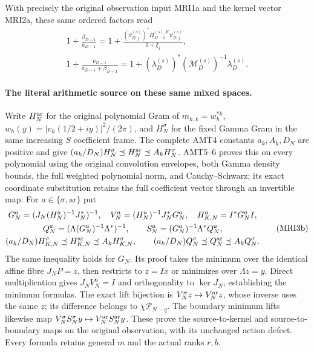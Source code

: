 \documentclass[11pt,a4paper]{article}
\begin{document}
With precisely the original observation input MRI1a and the
kernel vector MRI2a, these same ordered factors read
\[
\begin{gathered}
 1+\frac{\beta_{D-1}}{a_{D-1}}
   =1+\frac{(\vartheta_{D,j}^{(s)})^*
                  H_{D-1}^{(s),K}\vartheta_{D,j}^{(s)}}{1+\xi_j},\\
 1+\frac{\nu_{D-1}}{a_{D-1}+\beta_{D-1}}
   =1+(\lambda_D^{(s)})^*(\mathcal M_D^{(s)})^{-1}
                                              \lambda_D^{(s)}.
\end{gathered}\tag{MRI3a}
\]

\paragraph{The literal arithmetic source on these same mixed spaces.}
Write $H_N^{\rm ar}$ for the original polynomial Gram of
$m_{h,k}=w_h^{*k}$, $w_h(y)=|v_h(1/2+iy)|^2/(2\pi)$,
and $H_N^\sigma$ for the fixed Gamma Gram in the same
increasing $S$ coefficient frame. The complete AMT4 constants
$a_k,A_k,D_N$ are positive and give
$(a_k/D_N)H_N^\sigma\preceq H_N^{\rm ar}\preceq A_kH_N^\sigma$.
AMT5--6 proves this on every polynomial using the original
convolution envelopes, both Gamma density bounds, the full
weighted polynomial norm, and Cauchy--Schwarz; its exact
coordinate substitution retains the full coefficient vector
through an invertible map. For $a\in\{\sigma,\mathrm{ar}\}$ put
\[
\begin{gathered}
 G_N^a=(J_N(H_N^a)^{-1}J_N^*)^{-1},\quad
 V_N^a=(H_N^a)^{-1}J_N^*G_N^a,\quad H_{K,N}^a=I^*G_N^aI,\\
 Q_N^a=(\Lambda(G_N^a)^{-1}\Lambda^*)^{-1},\qquad
 S_N^a=(G_N^a)^{-1}\Lambda^*Q_N^a,\\
 (a_k/D_N)H_{K,N}^\sigma\preceq H_{K,N}^{\rm ar}
                                      \preceq A_kH_{K,N}^\sigma,\qquad
 (a_k/D_N)Q_N^\sigma\preceq Q_N^{\rm ar}\preceq A_kQ_N^\sigma.
\end{gathered}\tag{MRI3b}
\]
The same inequality holds for $G_N$. Its proof takes the
minimum over the identical affine fibre $J_NP=z$, then
restricts to $z=Ix$ or minimizes over $\Lambda z=y$.
Direct multiplication gives $J_NV_N^a=I$ and orthogonality
to $\ker J_N$, establishing the minimum formulas. The exact
lift bijection is $V_N^\sigma z\mapsto V_N^{\rm ar}z$,
whose inverse uses the same $z$; its difference belongs to
$\chi\mathcal P_{N-q}$. The boundary minimum lifts likewise
map $V_N^\sigma S_N^\sigma y\mapsto V_N^{\rm ar}S_N^{\rm ar}y$.
These prove the source-to-kernel and source-to-boundary maps
on the original observation, with its unchanged action defect.
Every formula retains general $m$ and the actual ranks $r,b$.
\end{document}
